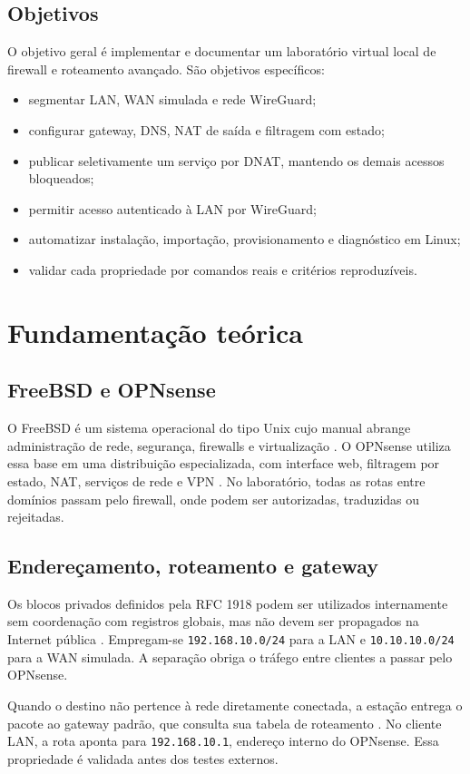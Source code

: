 \documentclass[12pt,a4paper]{article}
\newcommand{\ip}[1]{\texttt{#1}}
\begin{document}
\subsection{Objetivos}
O objetivo geral é implementar e documentar um laboratório virtual local de
firewall e roteamento avançado. São objetivos específicos:
\begin{itemize}
\item segmentar LAN, WAN simulada e rede WireGuard;
\item configurar gateway, DNS, NAT de saída e filtragem com estado;
\item publicar seletivamente um serviço por DNAT, mantendo os demais acessos bloqueados;
\item permitir acesso autenticado à LAN por WireGuard;
\item automatizar instalação, importação, provisionamento e diagnóstico em Linux;
\item validar cada propriedade por comandos reais e critérios reproduzíveis.
\end{itemize}

\section{Fundamentação teórica}
\subsection{FreeBSD e OPNsense}
O FreeBSD é um sistema operacional do tipo Unix cujo manual abrange administração
de rede, segurança, firewalls e virtualização \citep{freebsdhandbook}. O OPNsense
utiliza essa base em uma distribuição especializada, com interface web,
filtragem por estado, NAT, serviços de rede e VPN \citep{opnsensedocs}. No
laboratório, todas as rotas entre domínios passam pelo firewall, onde podem ser
autorizadas, traduzidas ou rejeitadas.

\subsection{Endereçamento, roteamento e gateway}
Os blocos privados definidos pela RFC 1918 podem ser utilizados internamente sem
coordenação com registros globais, mas não devem ser propagados na Internet
pública \citep{rfc1918}. Empregam-se \ip{192.168.10.0/24} para a LAN e
\ip{10.10.10.0/24} para a WAN simulada. A separação obriga o tráfego entre
clientes a passar pelo OPNsense.

Quando o destino não pertence à rede diretamente conectada, a estação entrega o
pacote ao gateway padrão, que consulta sua tabela de roteamento
\citep{kurose2021,tanenbaum2021}. No cliente LAN, a rota aponta para
\ip{192.168.10.1}, endereço interno do OPNsense. Essa propriedade é validada
antes dos testes externos.
\end{document}
